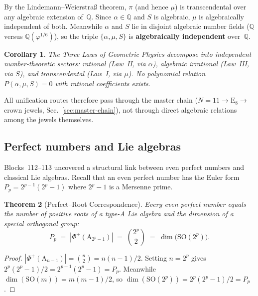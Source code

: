 \documentclass[aps,prd,twocolumn,superscriptaddress,floatfix,nofootinbib]{revtex4-2}
\newtheorem{theorem}{Theorem}
\newtheorem{corollary}[theorem]{Corollary}
\theoremstyle{definition}
\theoremstyle{remark}
\newcommand{\vp}{\varphi}
\begin{document}
\noindent
By the Lindemann--Weierstra\ss{} theorem, $\pi$ (and hence $\mu$) is
transcendental over any algebraic extension of~$\mathbb{Q}$.  Since
$\alpha\in\mathbb{Q}$ and $S$ is algebraic, $\mu$ is algebraically
independent of both.  Meanwhile $\alpha$ and $S$ lie in disjoint
algebraic number fields ($\mathbb{Q}$ versus $\mathbb{Q}(\vp^{1/6})$),
so the triple $\{\alpha, \mu, S\}$ is \textbf{algebraically
independent} over~$\mathbb{Q}$.

\begin{corollary}
The Three Laws of Geometric Physics decompose into independent
number-theoretic sectors: rational (Law~II, via $\alpha$),
algebraic irrational (Law~III, via $S$), and transcendental (Law~I,
via $\mu$).  No polynomial relation $P(\alpha, \mu, S) = 0$ with
rational coefficients exists.
\end{corollary}

\noindent
All unification routes therefore pass through the master chain
($N{=}11 \to \mathrm{E}_8 \to$ crown jewels, Sec.~\ref{sec:master-chain}),
not through direct algebraic relations among the jewels themselves.

\subsection{Perfect numbers and Lie algebras}
\label{sec:perfect-lie}

Blocks~112--113 uncovered a structural link between even perfect numbers
and classical Lie algebras.  Recall that an even perfect number has the
Euler form $P_p = 2^{p-1}(2^p - 1)$ where $2^p-1$ is a Mersenne prime.

\begin{theorem}[Perfect--Root Correspondence]
\label{thm:perfect-root}
Every even perfect number equals the number of positive roots of a
type-A Lie algebra and the dimension of a special orthogonal group:
\begin{equation}
P_p \;=\; |\Phi^+(\mathrm{A}_{2^p-1})| \;=\; \binom{2^p}{2}
     \;=\; \dim\bigl(\mathrm{SO}(2^p)\bigr).
\end{equation}
\end{theorem}

\begin{proof}
$|\Phi^+(\mathrm{A}_{n-1})| = \binom{n}{2} = n(n-1)/2$.
Setting $n = 2^p$ gives $2^p(2^p-1)/2 = 2^{p-1}(2^p-1) = P_p$.
Meanwhile $\dim(\mathrm{SO}(m)) = m(m-1)/2$, so
$\dim(\mathrm{SO}(2^p)) = 2^p(2^p-1)/2 = P_p$.
\end{proof}
\end{document}
